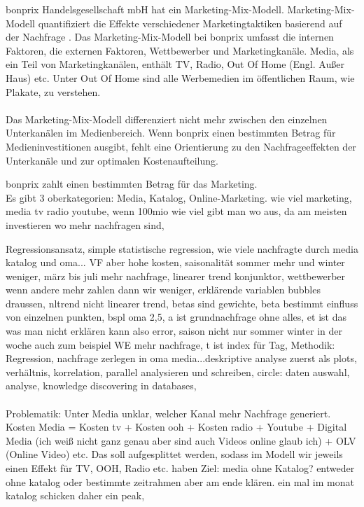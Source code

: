 \iffalse
bonprix Handelsgesellschaft mbH hat ein Marketing-Mix-Modell. Marketing-Mix-Modell quantifiziert die Effekte verschiedener Marketingtaktiken basierend auf der Nachfrage \cite{MMMdef}. Das Marketing-Mix-Modell bei bonprix umfasst die internen Faktoren, die externen Faktoren, Wettbewerber und Marketingkanäle. Media, als ein Teil von Marketingkanälen, enthält TV, Radio, Out Of Home (Engl. Außer Haus) etc. Unter Out Of Home sind alle Werbemedien im öffentlichen Raum, wie Plakate, zu verstehen. \\\\
Das Marketing-Mix-Modell differenziert nicht mehr zwischen den einzelnen Unterkanälen im Medienbereich. Wenn bonprix einen bestimmten Betrag für Medieninvestitionen ausgibt, fehlt eine Orientierung zu den Nachfrageeffekten der Unterkanäle und zur optimalen Kostenaufteilung.

bonprix zahlt einen bestimmten Betrag für das Marketing. \\ 
Es gibt 3 oberkategorien: Media, Katalog, Online-Marketing. wie viel marketing, media tv radio youtube, wenn 100mio wie viel gibt man wo aus, da am meisten investieren wo mehr nachfragen sind, 

Regressionsansatz, simple statistische regression, wie viele nachfragte durch media katalog und oma... VF aber hohe kosten, saisonalität sommer mehr und winter weniger, märz bis juli mehr nachfrage, linearer trend konjunktor, wettbewerber wenn andere mehr zahlen dann wir weniger, erklärende variablen bubbles draussen, nltrend nicht linearer trend, betas sind gewichte, beta bestimmt einfluss von einzelnen punkten, bspl oma 2,5, a ist grundnachfrage ohne alles, et ist das was man nicht erklären kann also error, saison nicht nur sommer winter in der woche auch zum beispiel WE mehr nachfrage, t ist index für Tag,
Methodik: Regression, nachfrage zerlegen in oma media...deskriptive analyse zuerst als plots, verhältnis, korrelation, parallel analysieren und schreiben, circle: daten auswahl, analyse, knowledge discovering in databases, \\ \\
Problematik: Unter Media unklar, welcher Kanal mehr Nachfrage generiert. Kosten Media = Kosten tv + Kosten ooh + Kosten radio + Youtube + Digital Media (ich weiß nicht ganz genau aber sind auch Videos online glaub ich) + OLV (Online Video) etc.
Das soll aufgesplittet werden, sodass im Modell wir jeweils einen Effekt für TV, OOH, Radio etc. haben
Ziel: media ohne Katalog? entweder ohne katalog oder bestimmte zeitrahmen aber am ende klären.  
ein mal im monat katalog schicken daher ein peak,

